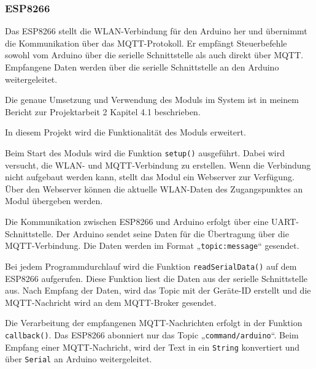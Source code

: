 \documentclass[12pt, letterpaper]{article}
\begin{document}
  \subsubsection{ESP8266}
 \par Das ESP8266 stellt die WLAN-Verbindung für den Arduino her und übernimmt die Kommunikation über das MQTT-Protokoll. Er empfängt Steuerbefehle sowohl vom Arduino über die serielle Schnittstelle als auch direkt über MQTT. Empfangene Daten werden über die serielle Schnittstelle an den Arduino weitergeleitet.
    \par Die genaue Umsetzung und Verwendung des Moduls im System ist in meinem Bericht zur Projektarbeit 2 \cite{pa2} Kapitel 4.1 beschrieben.
    \par In diesem Projekt wird die Funktionalität des Moduls erweitert.
  \par Beim Start des Moduls wird die Funktion \texttt{setup()} ausgeführt. Dabei wird versucht, die WLAN- und MQTT-Verbindung zu erstellen. Wenn die Verbindung nicht aufgebaut werden kann, stellt das Modul ein Webserver zur Verfügung. Über den Webserver können die aktuelle WLAN-Daten des Zugangspunktes an Modul übergeben werden.
  \par Die Kommunikation zwischen ESP8266 und Arduino erfolgt über eine UART-Schnittstelle. Der Arduino sendet seine Daten für die Übertragung über die MQTT-Verbindung. Die Daten werden im Format „\texttt{topic:message}“ gesendet.
  \par Bei jedem Programmdurchlauf wird die Funktion \texttt{readSerialData()} auf dem ESP8266 aufgerufen. Diese Funktion liest die Daten aus der serielle Schnittstelle aus. Nach Empfang der Daten, wird das Topic mit der Geräte-ID erstellt und die MQTT-Nachricht wird an dem MQTT-Broker gesendet.
  \par Die Verarbeitung der empfangenen MQTT-Nachrichten erfolgt in der Funktion \texttt{callback()}. Das ESP8266 abonniert nur das Topic „\texttt{command/arduino}“. Beim Empfang einer MQTT-Nachricht, wird der Text in ein \texttt{String} konvertiert und über \texttt{Serial} an Arduino weitergeleitet.
\end{document}
